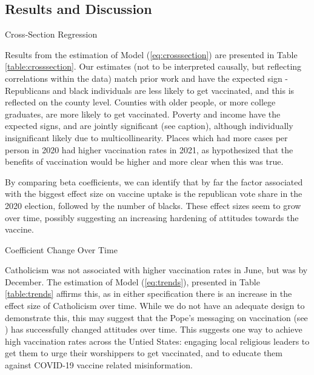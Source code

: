 \documentclass[12pt]{article}
\begin{document}
\begin{spacing}{1.5}
		\section{Results and Discussion}
		
		\begin{table}
			\centering
			\caption{Cross-Section Regression}
			\centerline{}
			\label{table:crosssection}
		\end{table}
		
		Results from the estimation of Model (\ref{eq:crosssection}) are presented in Table \ref{table:crosssection}. Our estimates (not to be interpreted causally, but reflecting correlations within the data) match prior work and have the expected sign - Republicans and black individuals are less likely to get vaccinated, and this is reflected on the county level. Counties with older people, or more college graduates, are more likely to get vaccinated. Poverty and income have the expected signs, and are jointly significant (see caption), although individually insignificant likely due to multicollinearity. Places which had more cases per person in 2020 had higher vaccination rates in 2021, as hypothesized that the benefits of vaccination would be higher and more clear when this was true.
		
		By comparing beta coefficients, we can identify that by far the factor associated with the biggest effect size on vaccine uptake is the republican vote share in the 2020 election, followed by the number of blacks. These effect sizes seem to grow over time, possibly suggesting an increasing hardening of attitudes towards the vaccine.
		
		\begin{table}
			\centering
			\caption{Coefficient Change Over Time}
			
			\label{table:trends}
		\end{table}
		
		Catholicism was not associated with higher vaccination rates in June, but was by December. The estimation of Model (\ref{eq:trends}), presented in Table \ref{table:trends} affirms this, as in either specification there is an increase in the effect size of Catholicism over time. While we do not have an adequate design to demonstrate this, this may suggest that the Pope's messaging on vaccination (see \citet{gawel_effects_2021}) has successfully changed attitudes over time. This suggests one way to achieve high vaccination rates across the Untied States: engaging local religious leaders to get them to urge their worshippers to get vaccinated, and to educate them against COVID-19 vaccine related misinformation.
		

\end{spacing}
\end{document}
